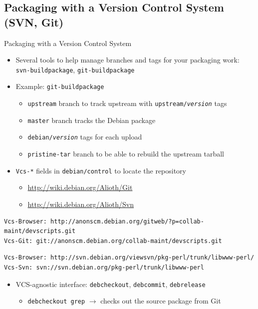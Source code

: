 \documentclass[10pt,final]{beamer}
\begin{document}
\subsection{Packaging with a Version Control System (SVN, Git)}
\begin{frame}[fragile=singleslide]{Packaging with a Version Control System}
  \begin{itemize}
  \item Several tools to help manage branches and tags for your packaging work:\\
    \texttt{svn-buildpackage}, \texttt{git-buildpackage}
    \hbr
  \item Example: \texttt{git-buildpackage}
    \begin{itemize}
    \item \texttt{upstream} branch to track upstream with \texttt{upstream/\textsl{version}} tags
    \item \texttt{master} branch tracks the Debian package
    \item \texttt{debian/\textsl{version}} tags for each upload
    \item \texttt{pristine-tar} branch to be able to rebuild the upstream tarball
    \end{itemize}
    \hbr
  \item \texttt{Vcs-*} fields in \texttt{debian/control} to locate the repository
	  \begin{itemize}
		\item \url{http://wiki.debian.org/Alioth/Git}
		\item \url{http://wiki.debian.org/Alioth/Svn}
	\end{itemize}
\end{itemize}
  \begin{lstlisting}[basicstyle=\ttfamily\scriptsize]
Vcs-Browser: http://anonscm.debian.org/gitweb/?p=collab-maint/devscripts.git
Vcs-Git: git://anonscm.debian.org/collab-maint/devscripts.git
  \end{lstlisting}
  \begin{lstlisting}[basicstyle=\ttfamily\scriptsize]
Vcs-Browser: http://svn.debian.org/viewsvn/pkg-perl/trunk/libwww-perl/
Vcs-Svn: svn://svn.debian.org/pkg-perl/trunk/libwww-perl
  \end{lstlisting}
  \begin{itemize}
  \item VCS-agnostic interface: \texttt{debcheckout}, \texttt{debcommit},
    \texttt{debrelease}\\
    \begin{itemize}
	    \item     \texttt{debcheckout grep} $\rightarrow$ checks out the source package
    from Git
    \end{itemize}
\end{itemize}
\end{frame}
\end{document}
